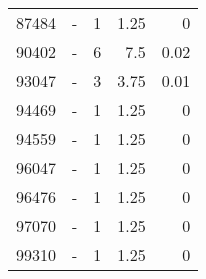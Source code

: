 \begin{longtable}{lXrrr}
        87484 & \multicolumn{1}{X}{-} & %
          \num{1} &
          \num[round-mode=places,round-precision=2]{1,25} &
          \num[round-mode=places,round-precision=2]{0} \\

        90402 & \multicolumn{1}{X}{-} & %
          \num{6} &
          \num[round-mode=places,round-precision=2]{7,5} &
          \num[round-mode=places,round-precision=2]{0,02} \\

        93047 & \multicolumn{1}{X}{-} & %
          \num{3} &
          \num[round-mode=places,round-precision=2]{3,75} &
          \num[round-mode=places,round-precision=2]{0,01} \\

        94469 & \multicolumn{1}{X}{-} & %
          \num{1} &
          \num[round-mode=places,round-precision=2]{1,25} &
          \num[round-mode=places,round-precision=2]{0} \\

        94559 & \multicolumn{1}{X}{-} & %
          \num{1} &
          \num[round-mode=places,round-precision=2]{1,25} &
          \num[round-mode=places,round-precision=2]{0} \\

        96047 & \multicolumn{1}{X}{-} & %
          \num{1} &
          \num[round-mode=places,round-precision=2]{1,25} &
          \num[round-mode=places,round-precision=2]{0} \\

        96476 & \multicolumn{1}{X}{-} & %
          \num{1} &
          \num[round-mode=places,round-precision=2]{1,25} &
          \num[round-mode=places,round-precision=2]{0} \\

        97070 & \multicolumn{1}{X}{-} & %
          \num{1} &
          \num[round-mode=places,round-precision=2]{1,25} &
          \num[round-mode=places,round-precision=2]{0} \\

        99310 & \multicolumn{1}{X}{-} & %
          \num{1} &
          \num[round-mode=places,round-precision=2]{1,25} &
          \num[round-mode=places,round-precision=2]{0} \\


\end{longtable}
